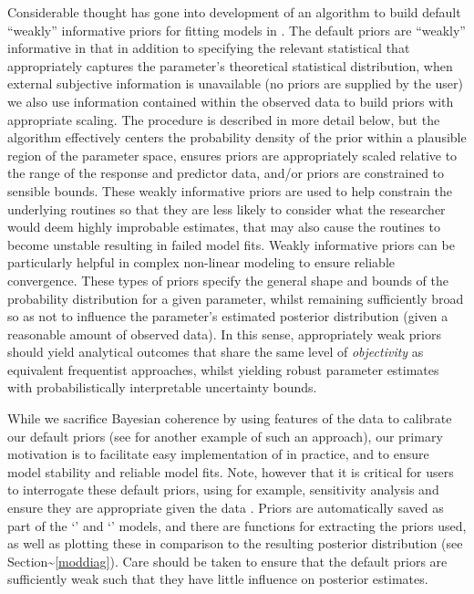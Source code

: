 \documentclass[
  shortnames]{jss}
\newcommand{\cls}[1]{`\code{#1}'}
\begin{document}
Considerable thought has gone into development of an algorithm to build default ``weakly'' informative priors for fitting models in . The default priors are ``weakly'' informative in that in addition to specifying the relevant statistical  that appropriately captures the parameter's theoretical statistical distribution, when external
subjective information is unavailable (no priors are supplied by the user) we also use information contained within the observed data to build priors with appropriate scaling. The procedure is described in more detail below, but the algorithm effectively centers the probability density of the prior within a plausible region of the parameter space, ensures priors are appropriately scaled relative to the range of the response and predictor data, and/or priors are constrained to sensible bounds. These weakly informative priors are used to help constrain the underlying routines so that they are less likely to consider what the researcher would deem highly improbable estimates, that may also cause the routines to become unstable resulting in failed model fits. Weakly informative priors can be particularly helpful in complex non-linear modeling to ensure reliable convergence. These types of priors specify the general shape and bounds of the probability distribution for a given parameter, whilst remaining sufficiently broad so as not to influence the parameter's estimated posterior distribution (given a reasonable amount of observed data). In this sense, appropriately weak priors should yield analytical outcomes that share the same level of \emph{objectivity} as equivalent frequentist approaches, whilst yielding robust parameter estimates with probabilistically interpretable uncertainty bounds.

While we sacrifice Bayesian coherence by using features of the data to calibrate our default priors (see \citet{chipman2010} for another example of such an approach), our primary motivation is to facilitate easy implementation of  in practice, and to ensure model stability and reliable model fits. Note, however that it is critical for users to interrogate these default priors, using for example, sensitivity analysis \citep{depaoli2020importance} and ensure they are appropriate given the data \citep{gelman2017entropy}. Priors are automatically saved as part of the \cls{brmsfit} and \cls{bayesnecfit} models, and there are functions for extracting the priors used, as well as plotting these in comparison to the resulting posterior distribution (see Section\textasciitilde{}\ref{moddiag}). Care should be taken to ensure that the default priors are sufficiently weak such that they have little influence on posterior estimates.
\end{document}
